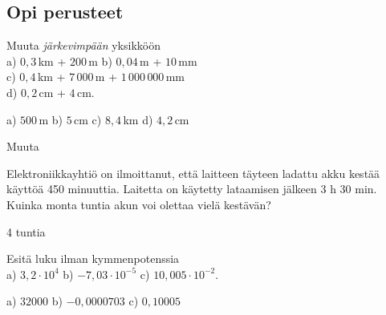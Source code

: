 
\begin{tehtavasivu}

\subsection*{Opi perusteet}

\begin{tehtava}
Muuta \emph{järkevimpään} yksikköön \\
a) $0,3$\,km + $200$\,m \qquad
b) $0,04$\,m + $10$\,mm \\
c) $0,4$\,km + $7\,000$\,m + $1\,000\,000$\,mm \\
d) $0,2$\,cm + $4$\,cm. 
\begin{vastaus}
a) $500$\,m \qquad
b) $5$\,cm \qquad
c) $8,4$\,km \qquad
d) $4,2$\,cm
\end{vastaus}
\end{tehtava}

\begin{tehtava}
Muuta \\
      \begin{alakohdat}
      \end{alakohdat}
  \begin{vastaus}
    \begin{alakohdat}
      \end{alakohdat}
  \end{vastaus}
\end{tehtava}

\begin{tehtava}
Elektroniikkayhtiö on ilmoittanut, että laitteen täyteen ladattu akku kestää käyttöä 450 minuuttia. Laitetta on käytetty lataamisen jälkeen 3 h 30 min. Kuinka monta tuntia akun voi olettaa vielä kestävän?
\begin{vastaus}
4 tuntia
\end{vastaus}
\end{tehtava}

\begin{tehtava}
Esitä luku ilman kymmenpotenssia \\
a) $3,2 \cdot 10^4$ \quad
b) $-7,03 \cdot 10^{-5}$ \quad
c) $10,005 \cdot 10^{-2}$. \quad
\begin{vastaus}
a) $32000$ \qquad
b) $-0,0000703$ \qquad
c) $0,10005$ \qquad
\end{vastaus}
\end{tehtava}


\end{tehtavasivu}
